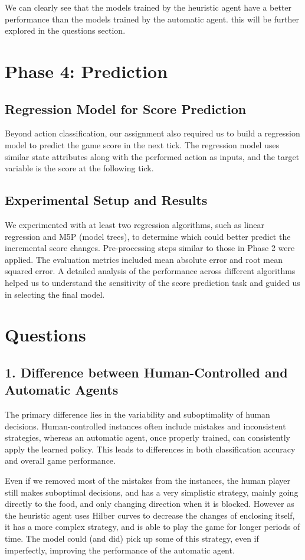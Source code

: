 \documentclass[12pt,a4paper]{article}
\begin{document}
We can clearly see that the models trained by the heuristic agent have a better performance than the models trained by the automatic agent.
this will be further explored in the questions section.



\section{Phase 4: Prediction}
\subsection{Regression Model for Score Prediction}
Beyond action classification, our assignment also required us to build a regression model to predict the game score in the next tick. The regression model uses similar state attributes along with the performed action as inputs, and the target variable is the score at the following tick.

\subsection{Experimental Setup and Results}
We experimented with at least two regression algorithms, such as linear regression and M5P (model trees), to determine which could better predict the incremental score changes. Pre-processing steps similar to those in Phase 2 were applied. The evaluation metrics included mean absolute error and root mean squared error. A detailed analysis of the performance across different algorithms helped us to understand the sensitivity of the score prediction task and guided us in selecting the final model.

\section{Questions}
\subsection*{1. Difference between Human-Controlled and Automatic Agents}
The primary difference lies in the variability and suboptimality of human decisions. 
Human-controlled instances often include mistakes and inconsistent strategies, whereas an automatic agent, once properly trained, can consistently apply the learned policy. 
This leads to differences in both classification accuracy and overall game performance.

Even if we removed most of the mistakes from the instances, the human player still makes suboptimal decisions,
and has a very simplistic strategy, mainly going directly to the food, and only changing direction when it is blocked.
However as the heuristic agent uses Hilber curves to decrease the changes of enclosing itself, it has a more complex strategy, and is able to play the game for longer periods of time.
The model could (and did) pick up some of this strategy, even if imperfectly, improving the performance of the automatic agent.
\end{document}
